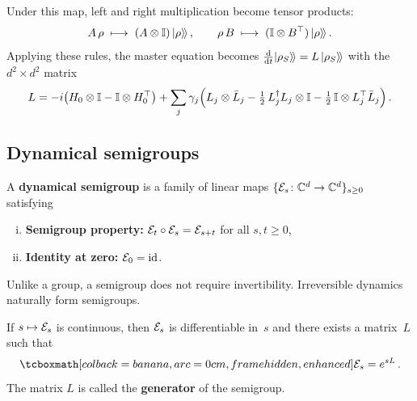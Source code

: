 Under this map, left and right multiplication become tensor products:
\begin{equation}\label{eq:vec-rules}
  A\,\rho \;\longmapsto\;
    (A \otimes \mathbb{I})\,\lvert \rho \rangle\!\rangle\,,
  \qquad
  \rho\, B \;\longmapsto\;
    (\mathbb{I} \otimes B^\top)\,\lvert \rho \rangle\!\rangle\,.
\end{equation}
Applying these rules, the master equation becomes
$\frac{\mathrm{d}}{\mathrm{d} t}\lvert \rho_S \rangle\!\rangle = L\,\lvert \rho_S \rangle\!\rangle$
with the $d^2\times d^2$ matrix
\begin{equation}\label{eq:L-matrix}
  L = -i\bigl(H_0\otimes\mathbb{I} - \mathbb{I}\otimes H_0^\top\bigr)
    + \sum_j \gamma_j\Bigl(
      L_j \otimes \bar{L}_j
      - \tfrac{1}{2}\,L_j^\dagger L_j\otimes\mathbb{I}
      - \tfrac{1}{2}\,\mathbb{I}\otimes L_j^\top \bar{L}_j
    \Bigr)\,.
\end{equation}

\subsection{Dynamical semigroups}\label{sec:dynamical-semigroups}

\begin{definition}\label{def:dyn-semigroup}
  A \textbf{dynamical semigroup} is a family of linear maps
  $\{\mathcal{E}_s\colon \mathbb{C}^d \to \mathbb{C}^d\}_{s \geq 0}$ satisfying
  \begin{enumerate}[(i)]
    \item \textbf{Semigroup property:}\;
      $\mathcal{E}_t \circ \mathcal{E}_s = \mathcal{E}_{s+t}$
      for all $s, t \geq 0$,
    \item \textbf{Identity at zero:}\; $\mathcal{E}_0 = \operatorname{id}$.
  \end{enumerate}
\end{definition}

\begin{remark}
  Unlike a group, a semigroup does not require invertibility.
  Irreversible dynamics naturally form semigroups.
\end{remark}

\begin{proposition}%
\label{prop:generator}
  If $s \mapsto \mathcal{E}_s$ is continuous, then $\mathcal{E}_s$ is
  differentiable in~$s$ and there exists a matrix~$L$ such that
  \begin{equation}\label{eq:exp-generator}
    \eqbox{\chan_s = e^{sL}}\,.
  \end{equation}
  The matrix $L$ is called the \textbf{generator} of the semigroup.
\end{proposition}

